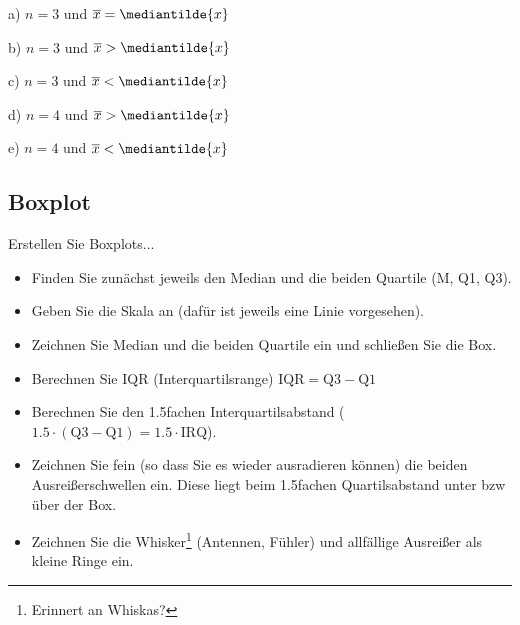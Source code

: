 a) $n=3$ und $\overline{x} = \mediantilde{x}$

b) $n=3$ und $\overline{x} > \mediantilde{x}$

c) $n=3$ und $\overline{x} < \mediantilde{x}$

d) $n=4$ und $\overline{x} > \mediantilde{x}$

e) $n=4$ und $\overline{x} < \mediantilde{x}$



\subsection{Boxplot}
Erstellen Sie Boxplots...


\begin{itemize}
\item Finden Sie zunächst jeweils den Median und die beiden Quartile
(M, Q1, Q3).
\item Geben Sie die Skala an (dafür ist jeweils eine Linie
vorgesehen).
\item Zeichnen Sie Median und die beiden Quartile ein und schließen
Sie die Box.
\item Berechnen Sie IQR (Interquartilsrange) $\textrm{IQR} = \textrm{Q3} - \textrm{Q1}$
\item Berechnen Sie den 1.5fachen Interquartilsabstand
($1.5\cdot{}(\textrm{Q3}-\textrm{Q1}) = 1.5 \cdot \textrm{IRQ}$).
\item Zeichnen Sie fein (so dass Sie es wieder ausradieren können) die beiden
Ausreißerschwellen ein. Diese liegt beim 1.5fachen Quartilsabstand
unter bzw über der Box.
\item Zeichnen Sie die Whisker\footnote{Erinnert an Whiskas?}
(Antennen, Fühler) und  allfällige Ausreißer als kleine Ringe ein.
\end{itemize}

